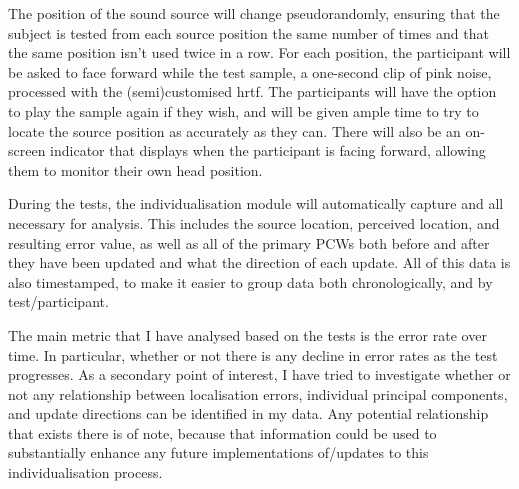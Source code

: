 The position of the sound source will change pseudorandomly, ensuring that the subject is tested from each source position the same number of times and that the same position isn't used twice in a row. For each position, the participant will be asked to face forward while the test sample, a one-second clip of pink noise, processed with the (semi)customised hrtf. The participants will have the option to play the sample again if they wish, and will be given ample time to try to locate the source position as accurately as they can. There will also be an on-screen indicator that displays when the participant is facing forward, allowing them to monitor their own head position.

During the tests, the individualisation module will automatically capture and all necessary for analysis. This includes the source location, perceived location, and resulting error value, as well as all of the primary PCWs both before and after they have been updated and what the direction of each update. All of this data is also timestamped, to make it easier to group data both chronologically, and by test/participant. 

The main metric that I have analysed based on the tests is the error rate over time. In particular, whether or not there is any decline in error rates as the test progresses. As a secondary point of interest, I have tried to investigate whether or not any relationship between localisation errors, individual principal components, and update directions can be identified in my data. Any potential relationship that exists there is of note, because that information could be used to substantially enhance any future implementations of/updates to this individualisation process.